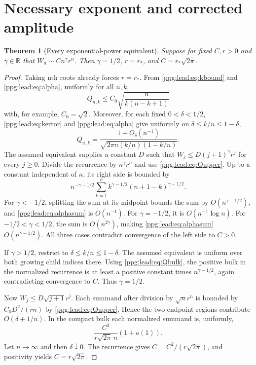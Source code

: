 \documentclass[11pt,letterpaper]{article}
\newtheorem{theorem}{Theorem}[section]
\theoremstyle{remark}\newtheorem{remark}[theorem]{Remark}
\numberwithin{equation}{section}
\begin{document}
\section{Necessary exponent and corrected amplitude}\label{ppg:lead:sec:conditional}
\begin{theorem}[Every exponential-power equivalent]\label{ppg:lead:thm:conditional}
Suppose for fixed $C,r>0$ and $\gamma\in\mathbb R$ that
$W_n\sim Cn^\gamma r^n$. Then
$\gamma=1/2$, $r=r_*$, and $C=r_*\sqrt{2\pi}$.
\end{theorem}
\begin{proof}
Taking nth roots already forces $r=r_*$. From \eqref{ppg:lead:eq:kbound} and \eqref{ppg:lead:eq:alpha}, uniformly for all $n,k$,
\begin{equation}\label{ppg:lead:eq:Qupper}
 Q_{n,k}\le C_0\sqrt{\frac n{k(n-k+1)}}
\end{equation}
with, for example, $C_0=\sqrt2$. Moreover, for each fixed $0<\delta<1/2$, \eqref{ppg:lead:eq:kerror} and \eqref{ppg:lead:eq:alpha} give uniformly on $\delta\le k/n\le1-\delta$,
\begin{equation}\label{ppg:lead:eq:Qbulk}
 Q_{n,k}=\frac{1+O_\delta(n^{-1})}{\sqrt{2\pi n(k/n)(1-k/n)}}.
\end{equation}
The assumed equivalent supplies a constant $D$ such that
$W_j\le D(j+1)^\gamma r^j$ for every $j\ge0$. Divide the recurrence by $n^\gamma r^n$ and use \eqref{ppg:lead:eq:Qupper}. Up to a constant independent of $n$, its right side is bounded by
\begin{equation}\label{ppg:lead:eq:alphasum}
 n^{-\gamma-1/2}\sum_{k=1}^n
 k^{\gamma-1/2}(n+1-k)^{\gamma-1/2}.
\end{equation}
For $\gamma<-1/2$, splitting the sum at its midpoint bounds the sum by $O(n^{\gamma-1/2})$, and \eqref{ppg:lead:eq:alphasum} is $O(n^{-1})$. For $\gamma=-1/2$, it is $O(n^{-1}\log n)$. For $-1/2<\gamma<1/2$, the sum is $O(n^{2\gamma})$, making \eqref{ppg:lead:eq:alphasum} $O(n^{\gamma-1/2})$. All three cases contradict convergence of the left side to $C>0$.

If $\gamma>1/2$, restrict to $\delta\le k/n\le1-\delta$. The assumed equivalent is uniform over both growing child indices there. Using \eqref{ppg:lead:eq:Qbulk}, the positive bulk in the normalized recurrence is at least a positive constant times $n^{\gamma-1/2}$, again contradicting convergence to $C$. Thus $\gamma=1/2$.

Now $W_j\le D\sqrt{j+1}r^j$. Each summand after division by $\sqrt n r^n$ is bounded by $C_0D^2/(rn)$ by \eqref{ppg:lead:eq:Qupper}. Hence the two endpoint regions contribute $O(\delta+1/n)$. In the compact bulk each normalized summand is, uniformly,
\[
 \frac{C^2}{r\sqrt{2\pi}\,n}(1+o(1)).
\]
Let $n\to\infty$ and then $\delta\downarrow0$. The recurrence gives
$C=C^2/(r\sqrt{2\pi})$, and positivity yields $C=r\sqrt{2\pi}$.
\end{proof}
\end{document}
